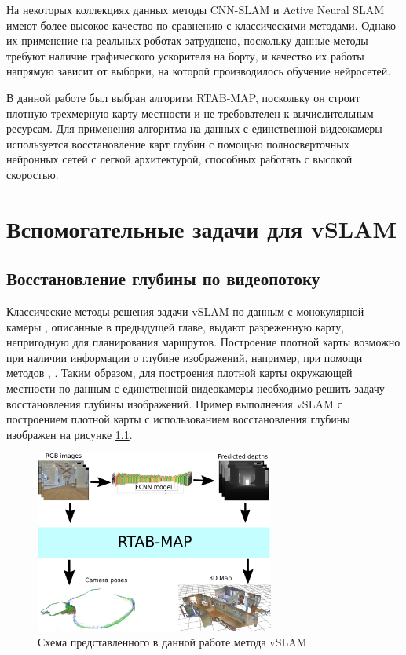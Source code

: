 \documentclass{mipt-thesis-ms}
\begin{document}
	На некоторых коллекциях данных методы CNN-SLAM и Active Neural SLAM имеют более высокое качество по сравнению с классическими методами. Однако их применение на реальных роботах затруднено, поскольку данные методы требуют наличие графического ускорителя на борту, и качество их работы напрямую зависит от выборки, на которой производилось обучение нейросетей.
	
	В данной работе был выбран алгоритм RTAB-MAP, поскольку он строит плотную трехмерную карту местности и не требователен к вычислительным ресурсам. Для применения алгоритма на данных с единственной видеокамеры используется восстановление карт глубин с помощью полносверточных нейронных сетей с легкой архитектурой, способных работать с высокой скоростью.
		
	
	\chapter{Вспомогательные задачи для vSLAM}
	
	\section{Восстановление глубины по видеопотоку}
	
	Классические методы решения задачи vSLAM по данным с монокулярной камеры \cite{mur2015orb} \cite{engel2014lsd}, описанные в предыдущей главе, выдают разреженную карту, непригодную для планирования маршрутов. Построение плотной карты возможно при наличии информации о глубине изображений, например, при помощи методов \cite{labbe2011memory}, \cite{endres20133}. Таким образом, для построения плотной карты окружающей местности по данным с единственной видеокамеры необходимо решить задачу восстановления глубины изображений. Пример выполнения vSLAM с построением плотной карты с использованием восстановления глубины изображен на рисунке \ref{figure_our_slam_pipeline}.
	
	\begin{figure}
		\centering
		\includegraphics[width=0.7\textwidth]{img/slam_scheme.png}
		\caption{Схема представленного в данной работе метода vSLAM}
		\label{figure_our_slam_pipeline}
	\end{figure}
	
\end{document}
